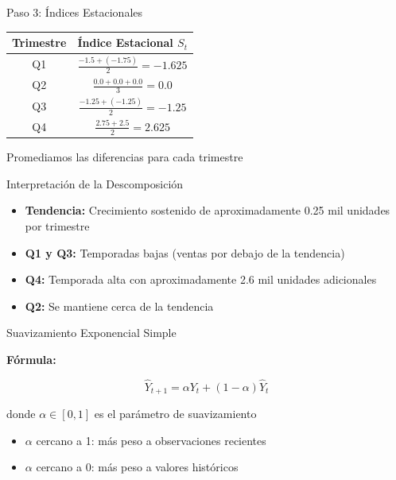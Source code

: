 \documentclass{beamer}
\begin{document}
\begin{frame}{Paso 3: Índices Estacionales}
    \begin{center}
        \begin{tabular}{cc}
            \toprule
            Trimestre & Índice Estacional $S_t$ \\
            \midrule
            Q1 & $\frac{-1.5 + (-1.75)}{2} = -1.625$ \\
            Q2 & $\frac{0.0 + 0.0 + 0.0}{3} = 0.0$ \\
            Q3 & $\frac{-1.25 + (-1.25)}{2} = -1.25$ \\
            Q4 & $\frac{2.75 + 2.5}{2} = 2.625$ \\
            \bottomrule
        \end{tabular}
    \end{center}
    
    \vspace{0.5cm}
    
    Promediamos las diferencias para cada trimestre
\end{frame}

\begin{frame}{Interpretación de la Descomposición}
    \begin{itemize}
        \item \textbf{Tendencia:} Crecimiento sostenido de aproximadamente 0.25 mil unidades por trimestre
        \item \textbf{Q1 y Q3:} Temporadas bajas (ventas por debajo de la tendencia)
        \item \textbf{Q4:} Temporada alta con aproximadamente 2.6 mil unidades adicionales
        \item \textbf{Q2:} Se mantiene cerca de la tendencia
    \end{itemize}
\end{frame}

\begin{frame}{Suavizamiento Exponencial Simple}
    \begin{center}
        \Large{\textbf{Fórmula:}}
        
        \[
        \hat{Y}_{t+1} = \alpha Y_t + (1-\alpha) \hat{Y}_t
        \]
        
        donde $\alpha \in [0,1]$ es el parámetro de suavizamiento
        
        \vspace{0.5cm}
        
        \begin{itemize}
            \item $\alpha$ cercano a 1: más peso a observaciones recientes
            \item $\alpha$ cercano a 0: más peso a valores históricos
        \end{itemize}
    \end{center}
\end{frame}
\end{document}

